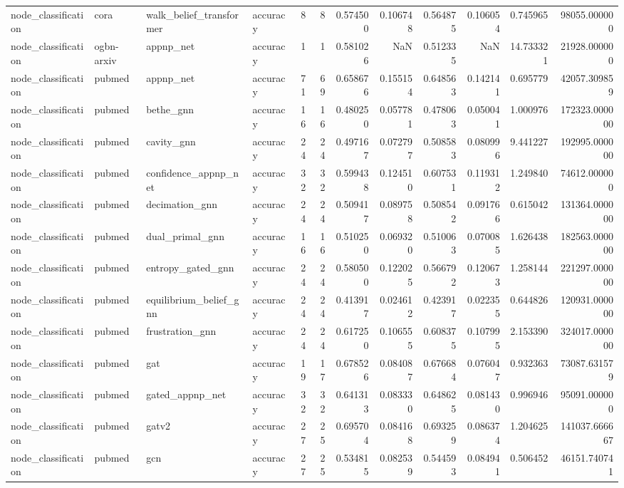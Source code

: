 \begin{tabular}{llllrrrrrrrr}
node_classification & cora & walk_belief_transformer & accuracy & 8 & 8 & 0.574500 & 0.106748 & 0.564875 & 0.106054 & 0.745965 & 98055.000000 \\
node_classification & ogbn-arxiv & appnp_net & accuracy & 1 & 1 & 0.581026 & NaN & 0.512335 & NaN & 14.733321 & 21928.000000 \\
node_classification & pubmed & appnp_net & accuracy & 71 & 69 & 0.658676 & 0.155154 & 0.648563 & 0.142141 & 0.695779 & 42057.309859 \\
node_classification & pubmed & bethe_gnn & accuracy & 16 & 16 & 0.480250 & 0.057781 & 0.478063 & 0.050041 & 1.000976 & 172323.000000 \\
node_classification & pubmed & cavity_gnn & accuracy & 24 & 24 & 0.497167 & 0.072797 & 0.508583 & 0.080996 & 9.441227 & 192995.000000 \\
node_classification & pubmed & confidence_appnp_net & accuracy & 32 & 32 & 0.599438 & 0.124510 & 0.607531 & 0.119312 & 1.249840 & 74612.000000 \\
node_classification & pubmed & decimation_gnn & accuracy & 24 & 24 & 0.509417 & 0.089758 & 0.508542 & 0.091766 & 0.615042 & 131364.000000 \\
node_classification & pubmed & dual_primal_gnn & accuracy & 16 & 16 & 0.510250 & 0.069320 & 0.510063 & 0.070085 & 1.626438 & 182563.000000 \\
node_classification & pubmed & entropy_gated_gnn & accuracy & 24 & 24 & 0.580500 & 0.122025 & 0.566792 & 0.120673 & 1.258144 & 221297.000000 \\
node_classification & pubmed & equilibrium_belief_gnn & accuracy & 24 & 24 & 0.413917 & 0.024612 & 0.423917 & 0.022355 & 0.644826 & 120931.000000 \\
node_classification & pubmed & frustration_gnn & accuracy & 24 & 24 & 0.617250 & 0.106555 & 0.608375 & 0.107995 & 2.153390 & 324017.000000 \\
node_classification & pubmed & gat & accuracy & 19 & 17 & 0.678526 & 0.084087 & 0.676684 & 0.076047 & 0.932363 & 73087.631579 \\
node_classification & pubmed & gated_appnp_net & accuracy & 32 & 32 & 0.641313 & 0.083330 & 0.648625 & 0.081430 & 0.996946 & 95091.000000 \\
node_classification & pubmed & gatv2 & accuracy & 27 & 25 & 0.695704 & 0.084168 & 0.693259 & 0.086374 & 1.204625 & 141037.666667 \\
node_classification & pubmed & gcn & accuracy & 27 & 25 & 0.534815 & 0.082539 & 0.544593 & 0.084941 & 0.506452 & 46151.740741 \\

\end{tabular}

